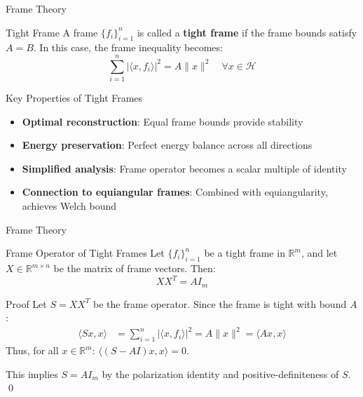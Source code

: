 \documentclass[9pt,dvipsnames]{beamer}
\begin{document}
\begin{frame}{Frame Theory}

	\begin{block}{Tight Frame}
		A frame $\{f_i\}_{i=1}^n$ is called a \textbf{tight frame} if the frame bounds satisfy $A = B$. In this case, the frame inequality becomes:
		\begin{equation*}
			\sum_{i=1}^n |\langle x, f_i \rangle|^2 = A \|x\|^2 \quad \forall x \in \mathcal{H}
		\end{equation*}
	\end{block}

	\begin{block}{Key Properties of Tight Frames}
		\begin{itemize}
			\item \textbf{Optimal reconstruction}: Equal frame bounds provide stability
			\item \textbf{Energy preservation}: Perfect energy balance across all directions
			\item \textbf{Simplified analysis}: Frame operator becomes a scalar multiple of identity
			\item \textbf{Connection to equiangular frames}: Combined with equiangularity, achieves Welch bound
		\end{itemize}
	\end{block}

\end{frame}
\begin{frame}{Frame Theory}

	\begin{block}{Frame Operator of Tight Frames}
		Let $\{f_i\}_{i=1}^n$ be a tight frame in $\mathbb{R}^m$, and let $X \in \mathbb{R}^{m \times n}$ be the matrix of frame vectors. Then:
		\begin{equation*}
			XX^T = A I_m
		\end{equation*}
	\end{block}

	\begin{block}{Proof}
		Let $S = XX^T$ be the frame operator. Since the frame is tight with bound $A$:
		\begin{align*}
			\langle Sx, x \rangle &= \sum_{i=1}^n |\langle x, f_i \rangle|^2 = A \|x\|^2 = \langle A x, x \rangle
		\end{align*}
		Thus, for all $x \in \mathbb{R}^m$: $\langle (S - A I)x, x \rangle = 0$.
		
		This implies $S = A I_m$ by the polarization identity and positive-definiteness of $S$. \qed
	\end{block}

\end{frame}
\end{document}
